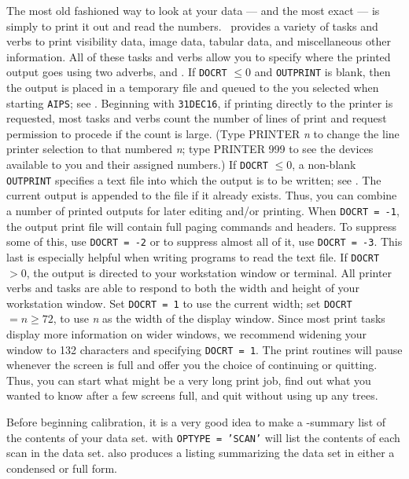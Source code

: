      The most old fashioned way to look at your data --- and the most
exact --- is simply to print it out and read the numbers.  \AIPS\
provides a variety of tasks and verbs to print visibility data, image
data, tabular data, and miscellaneous other information.  All of these
tasks and verbs allow you to specify where the printed output goes
using two adverbs, {\tt \tndx{DOCRT}} and {\tt \tndx{OUTPRINT}}\@.  If
{\tt DOCRT} $\le 0$ and {\tt OUTPRINT} is blank, then the output is
placed in a temporary file and queued to the \indx{printer} you
selected when starting {\tt AIPS}; see .  Beginning with
{\tt 31DEC16}, if printing directly to the printer is requested, most
tasks and verbs count the number of lines of print and request
permission to procede if the count is large.  (Type {\us PRINTER {\it
n\/} \CR} to change the line printer selection to that numbered {\it
n\/}; type {\us PRINTER 999 \CR} to see the devices available to you
and their assigned numbers.)  If {\tt DOCRT} $\le 0$, a non-blank {\tt
OUTPRINT} specifies a text file into which the output is to be
written; see .  The current output is appended to the
file if it already exists.  Thus, you can combine a number of printed
outputs for later editing and/or printing.  When {\tt DOCRT = -1}, the
output print file will contain full paging commands and headers.  To
suppress some of this, use {\tt DOCRT = -2} or to suppress almost all
of it, use {\tt DOCRT = -3}.  This last is especially helpful when
writing programs to read the text file.  If {\tt DOCRT} $> 0$, the
output is directed to your workstation window or terminal.  All
printer verbs and tasks are able to respond to both the width and
height of your workstation window.  Set {\tt DOCRT = 1} to use the
current width; set {\tt DOCRT} $= n \ge 72$, to use {\it n\/} as the
width of the display window.  Since most print tasks display more
information on wider windows, we recommend widening your window to 132
characters and specifying {\tt DOCRT = 1}.  The print routines will
pause whenever the screen is full and offer you the choice of
continuing or quitting.  Thus, you can start what might be a very long
print job, find out what you wanted to know after a few screens full,
and quit without using up any trees.


     Before beginning calibration, it is a very good idea to make a
-summary list of the contents of your data set.  {\tt \tndx{LISTR}}
with {\tt OPTYPE = 'SCAN'} will list the contents of each scan in the
data set. {\tt \tndx{DTSUM}} also produces a listing summarizing the
data set in either a condensed or full form.

